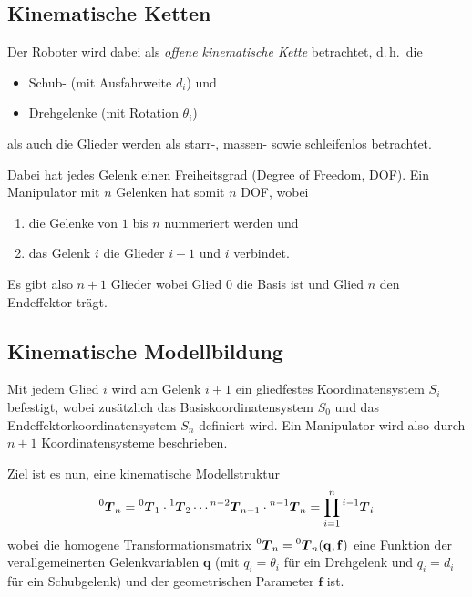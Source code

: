 \documentclass[a4paper, 11pt, accentcolor = tud3b]{tudreport}
\newcommand{\inreferenceto}[2]{\prescript{#1}{}{#2}}
\newcommand{\mat}[1]{\boldsymbol{#1}}
\renewcommand{\vec}[1]{\boldsymbol{\mathbf{#1}}}
\renewcommand{\dh}{d.\,h.~}
\begin{document}
			\subsection{Kinematische Ketten}
				Der Roboter wird dabei als \emph{offene kinematische Kette} betrachtet, \dh die
				\begin{itemize}
					\item Schub- (mit Ausfahrweite \( d_i \)) und
					\item Drehgelenke (mit Rotation \( \theta_i \))
				\end{itemize}
				als auch die Glieder werden als starr-, massen- sowie schleifenlos betrachtet.
				
				Dabei hat jedes Gelenk einen Freiheitsgrad (Degree of Freedom, DOF). Ein Manipulator mit \(n\) Gelenken hat somit \(n\) DOF, wobei
				\begin{enumerate}
					\item die Gelenke von \(1\) bis \(n\) nummeriert werden und
					\item das Gelenk \(i\) die Glieder \(i - 1\) und \(i\) verbindet.
				\end{enumerate}
				Es gibt also \(n + 1\) Glieder wobei Glied \(0\) die Basis ist und Glied \(n\) den Endeffektor trägt.

			\subsection{Kinematische Modellbildung}
				Mit jedem Glied \(i\) wird am Gelenk \(i + 1\) ein gliedfestes Koordinatensystem \(S_i\) befestigt, wobei zusätzlich das Basiskoordinatensystem \(S_0\) und das Endeffektorkoordinatensystem \(S_n\) definiert wird. Ein Manipulator wird also durch \( n + 1 \) Koordinatensysteme beschrieben.
				
				Ziel ist es nun, eine kinematische Modellstruktur
				\begin{equation*}
					\inreferenceto{0}{\mat{T}}_n = \inreferenceto{0}{\mat{T}}_1 \cdot \inreferenceto{1}{\mat{T}}_2 \cdots \inreferenceto{n - 2}{\mat{T}}_{n - 1} \cdot \inreferenceto{n - 1}{\mat{T}}_{n} = \prod_{i = 1}^{n} \inreferenceto{i - 1}{\mat{T}}_i
				\end{equation*}
				wobei die homogene Transformationsmatrix \( \inreferenceto{0}{\mat{T}}_n = \inreferenceto{0}{\mat{T}}_n(\vec{q}, \vec{f}) \) eine Funktion der verallgemeinerten Gelenkvariablen \( \vec{q} \) (mit \( q_i = \theta_i \) für ein Drehgelenk und \( q_i = d_i \) für ein Schubgelenk) und der geometrischen Parameter \( \vec{f} \) ist.
\end{document}

